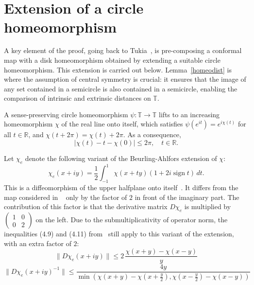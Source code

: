 \documentclass[11pt]{amsart}
\theoremstyle{remark}
\numberwithin{equation}{section}
\newcommand{\R}{\mathbb{R}}
\newcommand{\T}{\mathbb{T}}
\newcommand{\abs}[1]{\lvert#1\rvert}
\newcommand{\norm}[1]{\lVert#1\rVert}
\DeclareMathOperator{\sgn}{sign}
\begin{document}
\section{Extension of a circle homeomorphism}\label{BAextsec}

A key element of the proof, going back to Tukia~\cite{Tu2}, is pre-composing  a conformal map with a disk homeomorphism obtained by extending a suitable circle homeomorphism. This extension is carried out below. Lemma~\ref{homeodist} is where the assumption of central symmetry is crucial: it ensures that the  image  of any set contained in a semicircle is also contained in a semicircle, enabling the comparison of intrinsic and extrinsic distances on $\T$.  

A sense-preserving circle homeomorphism $\psi\colon \T\to\T$ lifts to an increasing homeomorphism $\chi$ of the real line onto itself, which satisfies $\psi (e^{it}) = e^{i \chi(t)}$ for all $t\in \R$, and $\chi(t+2\pi) = \chi(t) + 2\pi$.  As a consequence, 
\begin{equation}\label{notfar}
\abs{\chi(t)-t-\chi(0)} \le 2\pi, \quad t\in\R. 
\end{equation}

Let $\chi_e$ denote the following variant of the Beurling-Ahlfors extension of $\chi$: 
\begin{equation}\label{ext1}
\chi_e(x+iy)=\frac{1}{2}\int_{-1}^{1} \chi(x+ty)(1+2i\sgn t)\,dt.
\end{equation}
This is a diffeomorphism of the upper halfplane onto itself~\cite{Ahb,BA}. It differs from the map considered in ~\cite{Ahb} only by the factor of $2$ in front of the imaginary part. The contribution of this factor is that the derivative matrix $D\chi_e$ is multiplied by $\left(\begin{smallmatrix} 1 & 0 \\ 0 & 2 \end{smallmatrix}\right)$ on the left. Due to the submultiplicativity of operator norm, the inequalities (4.9) and (4.11) from~\cite{Ko} still apply to this variant of the extension, with an extra factor of $2$:
\begin{equation}\label{maxstr}
\norm{D\chi_e(x+iy)} \le 2\,\frac{\chi(x+y)-\chi(x-y)}{y}
\end{equation}
\begin{equation}\label{minstr}
\norm{D\chi_e(x+iy)^{-1}} \le \frac{4y}{\min(\chi(x+y)-\chi(x+\frac{y}2), \chi(x-\frac{y}2)-\chi(x-y))}
\end{equation}
\end{document}
